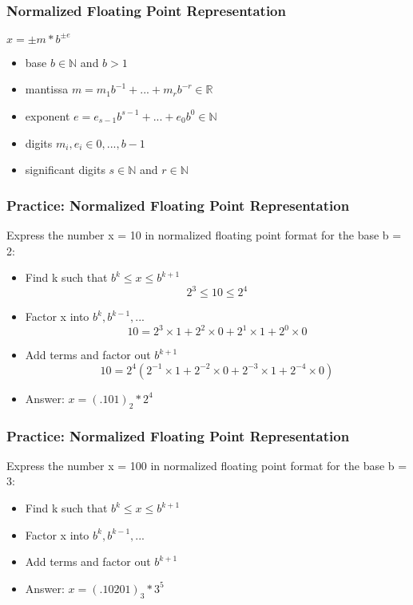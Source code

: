 \documentclass{beamer}
\begin{document}
\begin{frame}
\frametitle{Normalized Floating Point Representation}

\begin{center}
$x = \pm m * b^{\pm e}$
\end{center}

\begin{itemize}
\item base $b \in \mathbb{N}$ and $b > 1$
\item mantissa $m = m_1b^{-1}+...+m_rb^{-r} \in \mathbb{R}$
\item exponent $e = e_{s-1}b^{s-1}+...+e_0b^0 \in \mathbb{N}$
\item digits $m_i, e_i \in 0,...,b-1$
\item significant digits $s \in \mathbb{N}$ and $r \in \mathbb{N}$
\end{itemize}

\end{frame}

\begin{frame}
\frametitle{Practice: Normalized Floating Point Representation}

Express the number x = 10 in normalized floating point format for the base b = 2: 
\pause

\begin{itemize}
\item Find k such that $b^k \leq x \leq b^{k+1}$
$$2^3 \leq 10 \leq 2^4$$ \pause
\item Factor x into $b^k, b^{k-1},...$
$$10 = 2^3 \times 1 + 2^2 \times 0 + 2^1 \times 1 + 2^0 \times 0$$ \pause
\item Add terms and factor out $b^{k+1}$
$$10 = 2^4(2^{-1} \times 1 + 2^{-2} \times 0 + 2^{-3} \times 1 + 2^{-4} \times 0)$$ \pause
\item Answer: $x = (.101)_2 * 2^4$

\end{itemize}

\end{frame}

\begin{frame}
\frametitle{Practice: Normalized Floating Point Representation}

Express the number x = 100 in normalized floating point format for the base b = 3: 
\pause

\begin{itemize}
\item Find k such that $b^k \leq x \leq b^{k+1}$
\item Factor x into $b^k, b^{k-1},...$
\item Add terms and factor out $b^{k+1}$ \pause
\item Answer: $x = (.10201)_3 * 3^5$

\end{itemize}

\end{frame}
\end{document}
